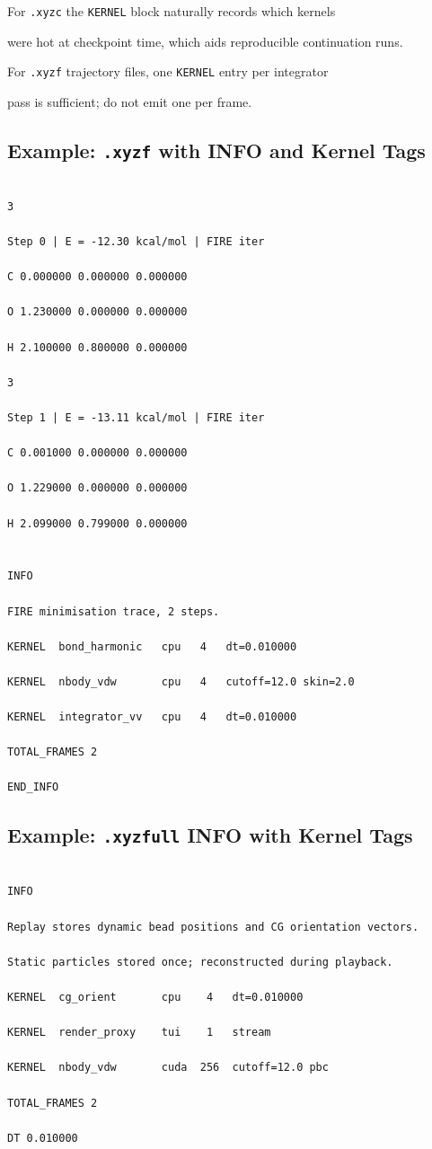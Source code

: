 \documentclass[12pt, a4paper, oneside]{article}
\begin{document}
For \texttt{.xyzc} the \texttt{KERNEL} block naturally records which kernels

were hot at checkpoint time, which aids reproducible continuation runs.

For \texttt{.xyzf} trajectory files, one \texttt{KERNEL} entry per integrator

pass is sufficient; do not emit one per frame.


\subsection{Example: \texttt{.xyzf} with INFO and Kernel Tags}


\begin{lstlisting}[language={},frame=single]

3

Step 0 | E = -12.30 kcal/mol | FIRE iter

C 0.000000 0.000000 0.000000

O 1.230000 0.000000 0.000000

H 2.100000 0.800000 0.000000

3

Step 1 | E = -13.11 kcal/mol | FIRE iter

C 0.001000 0.000000 0.000000

O 1.229000 0.000000 0.000000

H 2.099000 0.799000 0.000000


INFO

FIRE minimisation trace, 2 steps.

KERNEL  bond_harmonic   cpu   4   dt=0.010000

KERNEL  nbody_vdw       cpu   4   cutoff=12.0 skin=2.0

KERNEL  integrator_vv   cpu   4   dt=0.010000

TOTAL_FRAMES 2

END_INFO

\end{lstlisting}


\subsection{Example: \texttt{.xyzfull} INFO with Kernel Tags}


\begin{lstlisting}[language={},frame=single]

INFO

Replay stores dynamic bead positions and CG orientation vectors.

Static particles stored once; reconstructed during playback.

KERNEL  cg_orient       cpu    4   dt=0.010000

KERNEL  render_proxy    tui    1   stream

KERNEL  nbody_vdw       cuda  256  cutoff=12.0 pbc

TOTAL_FRAMES 2

DT 0.010000

\end{lstlisting}
\end{document}
